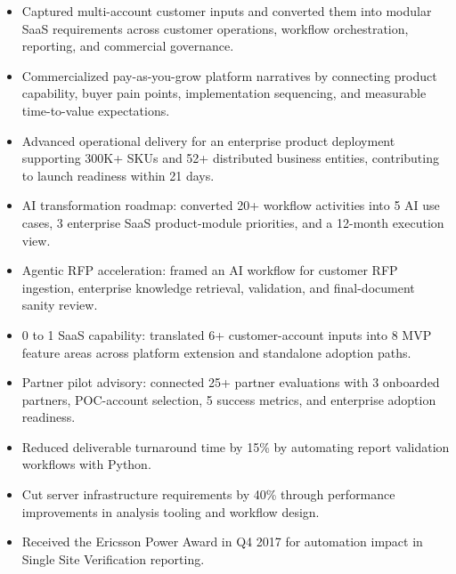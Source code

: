 \documentclass[10pt]{article}
\begin{document}
\begin{itemize}
  \item Captured multi-account customer inputs and converted them into modular SaaS requirements across customer operations, workflow orchestration, reporting, and commercial governance.
  \item Commercialized pay-as-you-grow platform narratives by connecting product capability, buyer pain points, implementation sequencing, and measurable time-to-value expectations.
  \item Advanced operational delivery for an enterprise product deployment supporting 300K+ SKUs and 52+ distributed business entities, contributing to launch readiness within 21 days.
\end{itemize}

\begin{itemize}
  \item AI transformation roadmap: converted 20+ workflow activities into 5 AI use cases, 3 enterprise SaaS product-module priorities, and a 12-month execution view.
  \item Agentic RFP acceleration: framed an AI workflow for customer RFP ingestion, enterprise knowledge retrieval, validation, and final-document sanity review.
  \item 0 to 1 SaaS capability: translated 6+ customer-account inputs into 8 MVP feature areas across platform extension and standalone adoption paths.
  \item Partner pilot advisory: connected 25+ partner evaluations with 3 onboarded partners, POC-account selection, 5 success metrics, and enterprise adoption readiness.
\end{itemize}

\begin{itemize}
  \item Reduced deliverable turnaround time by 15\% by automating report validation workflows with Python.
  \item Cut server infrastructure requirements by 40\% through performance improvements in analysis tooling and workflow design.
  \item Received the Ericsson Power Award in Q4 2017 for automation impact in Single Site Verification reporting.
\end{itemize}
\end{document}
